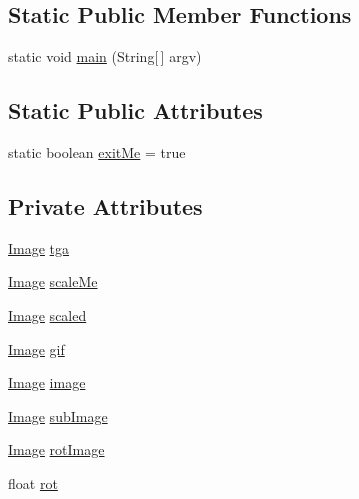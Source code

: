 \subsection*{Static Public Member Functions}
\begin{DoxyCompactItemize}
\item 
static void \mbox{\hyperlink{classorg_1_1newdawn_1_1slick_1_1tests_1_1_image_test_ab8dd8d019fe70989bbd2f75354d48c50}{main}} (String\mbox{[}$\,$\mbox{]} argv)
\end{DoxyCompactItemize}
\subsection*{Static Public Attributes}
\begin{DoxyCompactItemize}
\item 
static boolean \mbox{\hyperlink{classorg_1_1newdawn_1_1slick_1_1tests_1_1_image_test_ab4f8dc82794bf9949ac7efc7c1121bcc}{exit\+Me}} = true
\end{DoxyCompactItemize}
\subsection*{Private Attributes}
\begin{DoxyCompactItemize}
\item 
\mbox{\hyperlink{classorg_1_1newdawn_1_1slick_1_1_image}{Image}} \mbox{\hyperlink{classorg_1_1newdawn_1_1slick_1_1tests_1_1_image_test_a7ab57bed77d7042ab2204139e041b466}{tga}}
\item 
\mbox{\hyperlink{classorg_1_1newdawn_1_1slick_1_1_image}{Image}} \mbox{\hyperlink{classorg_1_1newdawn_1_1slick_1_1tests_1_1_image_test_afc4cce0f293036d9f2e821ec55a8e996}{scale\+Me}}
\item 
\mbox{\hyperlink{classorg_1_1newdawn_1_1slick_1_1_image}{Image}} \mbox{\hyperlink{classorg_1_1newdawn_1_1slick_1_1tests_1_1_image_test_a49ff6f770ac437fe50daa78dcbe98084}{scaled}}
\item 
\mbox{\hyperlink{classorg_1_1newdawn_1_1slick_1_1_image}{Image}} \mbox{\hyperlink{classorg_1_1newdawn_1_1slick_1_1tests_1_1_image_test_a382ccf0243ecc6050b7a56037fd71f54}{gif}}
\item 
\mbox{\hyperlink{classorg_1_1newdawn_1_1slick_1_1_image}{Image}} \mbox{\hyperlink{classorg_1_1newdawn_1_1slick_1_1tests_1_1_image_test_a6a3eac1a7e5d2b84a03f6bc68bb042de}{image}}
\item 
\mbox{\hyperlink{classorg_1_1newdawn_1_1slick_1_1_image}{Image}} \mbox{\hyperlink{classorg_1_1newdawn_1_1slick_1_1tests_1_1_image_test_a2900b4ce582e499edf146c02f56c24b2}{sub\+Image}}
\item 
\mbox{\hyperlink{classorg_1_1newdawn_1_1slick_1_1_image}{Image}} \mbox{\hyperlink{classorg_1_1newdawn_1_1slick_1_1tests_1_1_image_test_abd3da665257fd4917d04aab4373e001e}{rot\+Image}}
\item 
float \mbox{\hyperlink{classorg_1_1newdawn_1_1slick_1_1tests_1_1_image_test_a6fbbcc82d7dea5cda7b3a5bbe47c1cf0}{rot}}
\end{DoxyCompactItemize}

